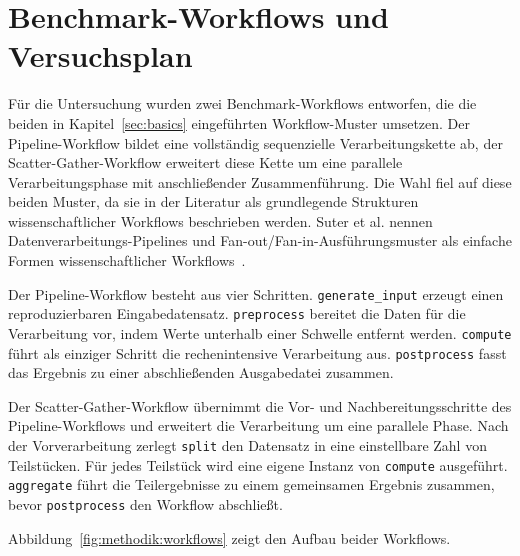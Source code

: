\section{Benchmark-Workflows und Versuchsplan}
\label{sec:methodik:versuchsplan}

Für die Untersuchung wurden zwei Benchmark-Workflows entworfen, die
die beiden in Kapitel~\ref{sec:basics} eingeführten Workflow-Muster
umsetzen. Der Pipeline-Workflow bildet eine vollständig
sequenzielle Verarbeitungskette ab, der Scatter-Gather-Workflow
erweitert diese Kette um eine parallele Verarbeitungsphase mit
anschließender Zusammenführung. Die Wahl fiel auf diese beiden
Muster, da sie in der Literatur als grundlegende Strukturen
wissenschaftlicher Workflows beschrieben werden. Suter et al. nennen Datenverarbeitungs-Pipelines und Fan-out/Fan-in-Ausführungsmuster als einfache Formen wissenschaftlicher Workflows~\cite[S.~4]{suter2026terminology}.

Der Pipeline-Workflow besteht aus vier Schritten.
\texttt{generate\_input} erzeugt einen reproduzierbaren
Eingabedatensatz. \texttt{preprocess} bereitet die Daten für die
Verarbeitung vor, indem Werte unterhalb einer Schwelle entfernt
werden. \texttt{compute} führt als einziger Schritt die
rechenintensive Verarbeitung aus. \texttt{postprocess} fasst das
Ergebnis zu einer abschließenden Ausgabedatei zusammen.

Der Scatter-Gather-Workflow übernimmt die Vor- und
Nachbereitungsschritte des Pipeline-Workflows und erweitert die
Verarbeitung um eine parallele Phase. Nach der Vorverarbeitung
zerlegt \texttt{split} den Datensatz in eine einstellbare Zahl von
Teilstücken. Für jedes Teilstück wird eine eigene Instanz von
\texttt{compute} ausgeführt. \texttt{aggregate} führt die
Teilergebnisse zu einem gemeinsamen Ergebnis zusammen, bevor
\texttt{postprocess} den Workflow abschließt.

Abbildung~\ref{fig:methodik:workflows} zeigt den Aufbau beider
Workflows.

